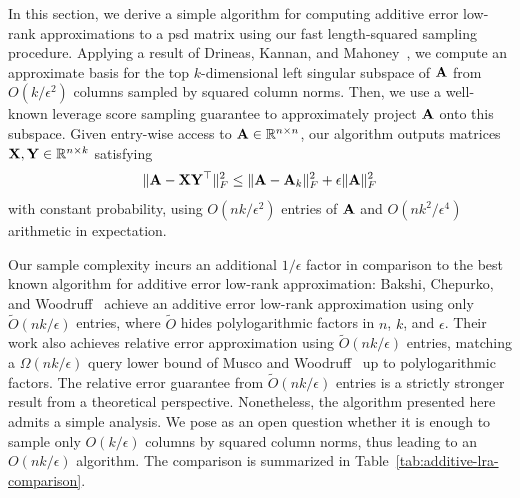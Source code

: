 In this section, we derive a simple algorithm for computing additive error low-rank approximations to a psd matrix using our fast length-squared sampling procedure. Applying a result of Drineas, Kannan, and Mahoney~\cite{drineas_fast_2006-1}, we compute an approximate basis for the top $k$-dimensional left singular subspace of $\mathbf{A}$ from $O(k/\epsilon^2)$ columns sampled by squared column norms. Then, we use a well-known leverage score sampling guarantee to approximately project $\mathbf{A}$ onto this subspace. Given entry-wise access to $\mathbf{A}\in\mathbb{R}^{n\times n}$, our algorithm outputs matrices $\mathbf{X}, \mathbf{Y}\in\mathbb{R}^{n\times k}$ satisfying
\[\|\mathbf{A} - \mathbf{X}\mathbf{Y}^\top\|^2_F\leq \|\mathbf{A} - \mathbf{A}_k\|^2_F + \epsilon\|\mathbf{A}\|^2_F\]
with constant probability, using $O(nk/\epsilon^2)$ entries of $\mathbf{A}$ and $O(nk^2/\epsilon^4)$ arithmetic in expectation.

Our sample complexity incurs an additional $1/\epsilon$ factor in comparison to the best known algorithm for additive error low-rank approximation: Bakshi, Chepurko, and Woodruff~\cite[Corollary 5.19]{bakshi_robust_2020} achieve an additive error low-rank approximation using only $\tilde O(nk/\epsilon)$ entries, where $\tilde O$ hides polylogarithmic factors in $n$, $k$, and $\epsilon$. Their work also achieves relative error approximation using $\tilde O(nk/\epsilon)$ entries, matching a $\Omega(nk/\epsilon)$ query lower bound of Musco and Woodruff~\cite{musco_sublinear_2019} up to polylogarithmic factors. The relative error guarantee from $\tilde O(nk/\epsilon)$ entries is a strictly stronger result from a theoretical perspective. Nonetheless, the algorithm presented here admits a simple analysis. We pose as an open question whether it is enough to sample only $O(k/\epsilon)$ columns by squared column norms, thus leading to an $O(nk/\epsilon)$ algorithm. The comparison is summarized in Table~\ref{tab:additive-lra-comparison}. 

